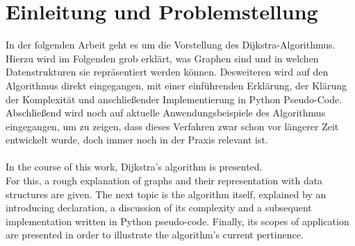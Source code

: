 \chapter{Einleitung und Problemstellung}

In der folgenden Arbeit geht es um die Vorstellung des Dijkstra-Algorithmus.
Hierzu wird im Folgenden grob erklärt, was Graphen sind und in welchen Datenstrukturen sie repräsentiert werden können.
Desweiteren wird auf den Algorithmus direkt eingegangen, mit einer einführenden Erklärung, der Klärung der Komplexität und anschließender Implementierung in Python Pseudo-Code.
Abschließend wird noch auf aktuelle Anwendungsbeispiele des Algorithmus eingegangen, um zu zeigen, dass dieses Verfahren zwar schon vor längerer Zeit entwickelt wurde, doch immer noch in der Praxis relevant ist.
\\
\\
In the course of this work, Dijkstra's algorithm is presented. \\
For this, a rough explanation of graphs and their representation with data structures are given. 
The next topic is the algorithm itself, explained by an introducing declaration, a discussion of its complexity and a subsequent implementation written in Python pseudo-code.
Finally, its scopes of application are presented in order to illustrate the algorithm's current pertinence.